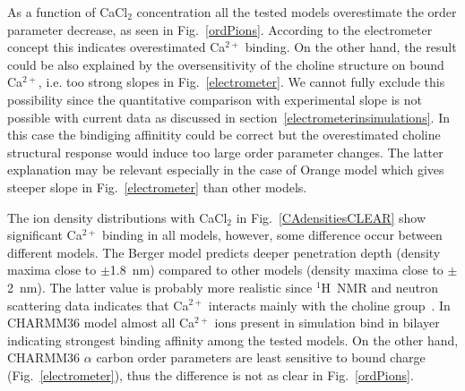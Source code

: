 \documentclass[pre,aps,floatfix,authordate1-4,twocolumn]{revtex4-1}
\begin{document}
As a function of CaCl$_2$ concentration all the tested models overestimate the order parameter decrease, 
as seen in Fig.~\ref{ordPions}. According to the electrometer concept this indicates overestimated
Ca$^{2+}$ binding. On the other hand, the result could be also explained by the oversensitivity of the
choline structure on bound Ca$^{2+}$, i.e. too strong slopes in Fig.~\ref{electrometer}. 
We cannot fully exclude this possibility since the quantitative comparison with experimental slope is
not possible with current data as discussed in section~\ref{electrometerinsimulations}.
In this case the bindiging affinitity could be correct but the overestimated choline structural response 
would induce too large order parameter changes. The latter explanation may be relevant especially in
the case of Orange model which gives steeper slope in Fig.~\ref{electrometer} than other models.

The ion density distributions with CaCl$_2$ in Fig.~\ref{CAdensitiesCLEAR} show significant
Ca$^{2+}$ binding in all models, however, some difference occur between different models.
The Berger model predicts deeper penetration depth (density maxima close to $\pm$1.8~nm) compared
to other models (density maxima close to $\pm$2~nm). The latter value is probably more realistic 
since $^1$H~NMR and neutron scattering data indicates that Ca$^{2+}$ interacts mainly with the 
choline group~\cite{hauser76,hauser78,herbette84,cevc90}. In CHARMM36 model almost all Ca$^{2+}$
ions present in simulation bind in bilayer indicating strongest binding affinity among the tested
models. On the other hand, CHARMM36 $\alpha$ carbon order parameters are least sensitive to bound
charge (Fig.~\ref{electrometer}), thus the difference is not as clear in Fig.~\ref{ordPions}.
\end{document}
